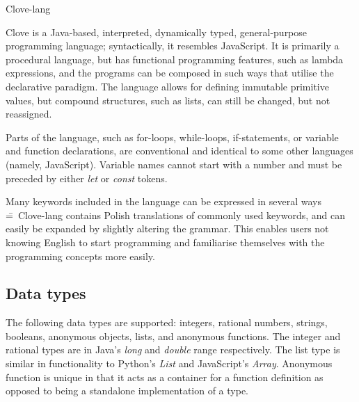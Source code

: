 \documentclass[12pt,a4paper]{article}
\begin{document}
\begin{center}
  \Huge {Clove-lang}
\end{center}

\noindent Clove is a Java-based, interpreted, dynamically typed, general-purpose programming language; syntactically, it resembles JavaScript. It is primarily a procedural language, but has functional programming features, such as lambda expressions, and the programs can be composed in such ways that utilise the declarative paradigm. The language allows for defining immutable primitive values, but compound structures, such as lists, can still be changed, but not reassigned.\par


Parts of the language, such as for-loops, while-loops, if-statements, or variable and function declarations, are conventional and identical to some other languages (namely, JavaScript). Variable names cannot start with a number and must be preceded by either \emph{let} or \emph{const} tokens.\par

Many keywords included in the language can be expressed in several ways \==~Clove-lang contains Polish translations of commonly used keywords, and can easily be expanded by slightly altering the grammar. This enables users not knowing English to start programming and familiarise themselves with the programming concepts more easily.



\subsection*{Data types}


The following data types are supported: integers, rational numbers, strings, booleans, anonymous objects, lists, and anonymous functions. The integer and rational types are in Java's \emph{long} and \emph{double} range respectively. The list type is similar in functionality to Python's \emph{List} and JavaScript's \emph{Array}. Anonymous function is unique in that it acts as a container for a function definition as opposed to being a standalone implementation of a type.\par
\end{document}

